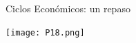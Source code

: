 \documentclass{beamer}
\begin{document}

\begin{frame}{Ciclos Económicos: un repaso}

\centering\texttt{[image: P18.png]}\

\end{frame}


      
    


\end{document}
